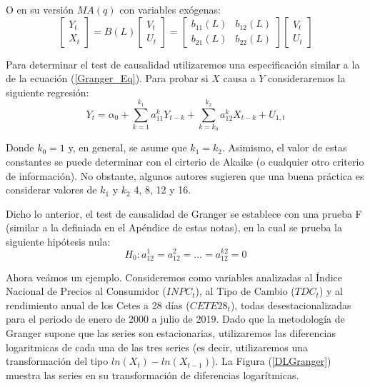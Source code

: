 \documentclass[
  a4paper,
]{article}
\begin{document}
O en su versión \(MA(q)\) con variables exógenas: \[
    \begin{bmatrix}
    Y_t \\ X_t
    \end{bmatrix}
    =
    B(L)
    \begin{bmatrix}
    V_t \\ U_t
    \end{bmatrix}
    =
    \begin{bmatrix}
    b_{11}(L) & b_{12}(L) \\ b_{21}(L) & b_{22}(L)
    \end{bmatrix}
    \begin{bmatrix}
    V_t \\ U_t
    \end{bmatrix}
\]

Para determinar el test de causalidad utilizaremos una especificación
similar a la de la ecuación (\ref{Granger_Eq}). Para probar si \(X\)
causa a \(Y\) consideraremos la siguiente regresión: \[
    Y_t = \alpha_0 + \sum^{k_1}_{k = 1} a^k_{11} Y_{t-k} + \sum^{k_2}_{k = k_0} a^k_{12} X_{t-k} + U_{1,t}
\]

Donde \(k_0 = 1\) y, en general, se asume que \(k_1 = k_2\). Asimismo,
el valor de estas constantes se puede determinar con el cirterio de
Akaike (o cualquier otro criterio de información). No obstante, algunos
autores sugieren que una buena práctica es considerar valores de \(k_1\)
y \(k_2\) 4, 8, 12 y 16.

Dicho lo anterior, el test de causalidad de Granger se establece con una
prueba F (similar a la definiada en el Apéndice de estas notas), en la
cual se prueba la siguiente hipótesis nula: \[
    H_0: a^1_{12} = a^2_{12} = \ldots = a^{k2}_{12} = 0
\]

Ahora veámos un ejemplo. Consideremos como variables analizadas al
Índice Nacional de Precios al Consumidor (\(INPC_t\)), al Tipo de Cambio
(\(TDC_t\)) y al rendimiento anual de los Cetes a 28 días
(\(CETE28_t\)), todas desestacionalizadas para el periodo de enero de
2000 a julio de 2019. Dado que la metodología de Granger supone que las
series son estacionarias, utilizaremos las diferencias logaritmicas de
cada una de las tres series (es decir, utilizaremos una transformación
del tipo \(ln(X_t) - ln(X_{t-1})\)). La Figura (\ref{DLGranger}) muestra
las series en su transformación de diferencias logarítmicas.
\end{document}
